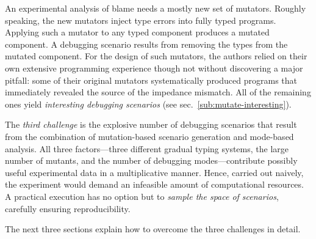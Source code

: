 An experimental analysis of blame needs a mostly new set of mutators.
Roughly speaking, the new mutators inject type errors into fully typed programs.
Applying such a mutator to any typed component produces a mutated component.  A
debugging scenario results from removing the types from the mutated
component. For the design of such mutators, the authors relied on their own
extensive programming experience though not without discovering a major pitfall:
some of their original mutators systematically produced programs that
immediately revealed the source of the impedance mismatch.  All of the remaining
ones yield {\em interesting debugging scenarios\/} (see
sec.~\ref{sub:mutate-interesting}).

The {\em third challenge\/} is the explosive number of debugging scenarios that
result from the combination of mutation-based scenario generation and mode-based
analysis. All three factors---three different gradual typing systems, the large
number of mutants, and the number of debugging modes---contribute possibly
useful experimental data in a multiplicative manner. Hence, carried out naively,
the experiment would demand an infeasible amount of computational
resources.  A practical execution has no option but to {\em sample the space of
scenarios\/}, carefully ensuring reproducibility.

The next three sections explain how to overcome the three challenges
in detail. 
